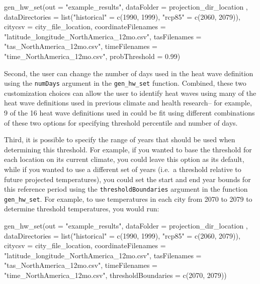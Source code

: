 \begin{Schunk}
\begin{Sinput}
gen_hw_set(out = "example_results",
           dataFolder = projection_dir_location ,
           dataDirectories = list("historical" = c(1990, 1999),
                                        "rcp85" = c(2060, 2079)),
           citycsv = city_file_location,
           coordinateFilenames = "latitude_longitude_NorthAmerica_12mo.csv",
           tasFilenames = "tas_NorthAmerica_12mo.csv",
           timeFilenames = "time_NorthAmerica_12mo.csv",
           probThreshold = 0.99)
\end{Sinput}
\end{Schunk}

\noindent Second, the user can change the number of days used in the
heat wave definition using the \texttt{numDays} argument in the
\texttt{gen\_hw\_set} function. Combined, these two customization
choices can allow the user to identify heat waves using many of the heat
wave definitions used in previous climate and health research-- for
example, 9 of the 16 heat wave definitions used in \citet{kent2014heat}
could be fit using different combinations of these two options for
specifying threshold percentile and number of days.

Third, it is possible to specify the range of years that should be used
when determining this threshold. For example, if you wanted to base the
threshold for each location on its current climate, you could leave this
option as its default, while if you wanted to use a different set of
years (i.e.~a threshold relative to future projected temperatures), you
could set the start and end year bounds for this reference period using
the \texttt{thresholdBoundaries} argument in the function
\texttt{gen\_hw\_set}. For example, to use temperatures in each city
from 2070 to 2079 to determine threshold temperatures, you would run:

\begin{Schunk}
\begin{Sinput}
gen_hw_set(out = "example_results",
           dataFolder = projection_dir_location ,
           dataDirectories = list("historical" = c(1990, 1999),
                                        "rcp85" = c(2060, 2079)),
           citycsv = city_file_location,
           coordinateFilenames = "latitude_longitude_NorthAmerica_12mo.csv",
           tasFilenames = "tas_NorthAmerica_12mo.csv",
           timeFilenames = "time_NorthAmerica_12mo.csv",
           thresholdBoundaries = c(2070, 2079))
\end{Sinput}
\end{Schunk}

